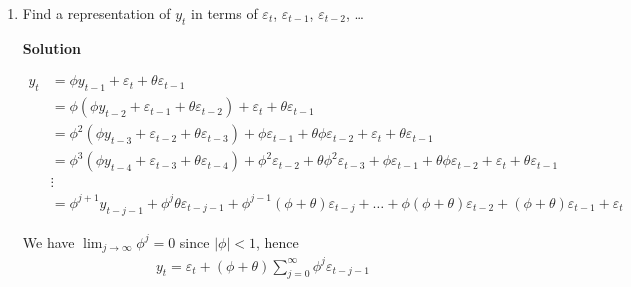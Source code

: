 \documentclass[12pt]{article}
\begin{document}
\begin{enumerate}

    \item Find a representation of $ y_{t} $ in terms of $ \varepsilon_{t} $, $ \varepsilon_{t-1} $, $ \varepsilon_{t-2} $, \ldots

          \textbf{Solution}

          \begin{align*}
              y_{t} & = \phi y_{t-1} + \varepsilon_{t} + \theta \varepsilon_{t-1}                                                                                                                                                                                               \\
                    & = \phi (\phi y_{t-2} + \varepsilon_{t-1} + \theta \varepsilon_{t-2}) + \varepsilon_{t} + \theta \varepsilon_{t-1}                                                                                                                                         \\
                    & = \phi^2 \left( \phi y_{t-3} + \varepsilon_{t-2} + \theta \varepsilon_{t-3} \right) + \phi \varepsilon_{t-1} + \theta \phi \varepsilon_{t-2} + \varepsilon_{t} + \theta \varepsilon_{t-1}                                                                 \\
                    & = \phi^3 \left( \phi y_{t-4} + \varepsilon_{t-3} + \theta \varepsilon_{t-4} \right) + \phi^2 \varepsilon_{t-2} + \theta \phi^2 \varepsilon_{t-3} + \phi \varepsilon_{t-1} + \theta \phi \varepsilon_{t-2} + \varepsilon_{t} + \theta \varepsilon_{t-1}    \\
                    & \vdots                                                                                                                                                                                                                                                    \\
                    & = \phi^{j+1} y_{t-j-1} + \phi^{j} \theta \varepsilon_{t-j-1} + \phi^{j-1} \left( \phi + \theta \right) \varepsilon_{t-j} + \ldots + \phi \left( \phi + \theta \right) \varepsilon_{t-2} + \left( \phi + \theta \right) \varepsilon_{t-1}+ \varepsilon_{t}
          \end{align*}

          We have $ \lim_{j \to \infty} \phi^{j} = 0 $ since $ | \phi | < 1 $, hence
          \begin{align*}
              y_{t} = \varepsilon_{t} + \left( \phi + \theta \right) \sum_{j=0}^{\infty} \phi^{j}  \varepsilon_{t-j-1}
          \end{align*}


\end{enumerate}
\end{document}
